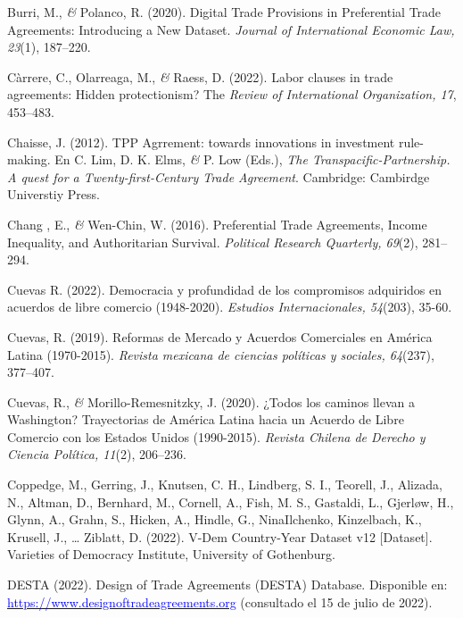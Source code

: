 \documentclass[a4paper]{tufte-handout}
\begin{document}
\begin{list}{}
\item{\small Burri, M., {\itshape \&} Polanco, R. (2020). Digital Trade Provisions in Preferential Trade Agreements: Introducing a New Dataset. {\itshape Journal of International Economic Law, 23}(1), 187--220.}

\item{\small Càrrere, C., Olarreaga, M., {\itshape \&} Raess, D. (2022). Labor clauses in trade agreements: Hidden protectionism? The {\itshape Review of International Organization, 17}, 453--483.}

\item{\small Chaisse, J. (2012). TPP Agrrement: towards innovations in investment rule-making. En C. Lim, D. K. Elms, {\itshape \&} P. Low (Eds.), {\itshape The Transpacific-Partnership. A quest for a Twenty-first-Century Trade Agreement}. Cambridge: Cambirdge Universtiy Press.}

\item{\small Chang , E., {\itshape \&} Wen-Chin, W. (2016). Preferential Trade Agreements, Income Inequality, and Authoritarian Survival. {\itshape Political Research Quarterly, 69}(2), 281--294.}

\item{\small Cuevas R. (2022). Democracia y profundidad de los compromisos adquiridos en acuerdos de libre comercio (1948-2020). {\itshape Estudios Internacionales, 54}(203), 35-60.}

\item{\small Cuevas, R. (2019). Reformas de Mercado y Acuerdos Comerciales en América Latina (1970-2015). {\itshape Revista mexicana de ciencias políticas y sociales, 64}(237), 377--407.}

\item{\small Cuevas, R., {\itshape \&} Morillo-Remesnitzky, J. (2020). ¿Todos los caminos llevan a Washington? Trayectorias de América Latina hacia un Acuerdo de Libre Comercio con los Estados Unidos (1990-2015). {\itshape Revista Chilena de Derecho y Ciencia Política, 11}(2), 206--236.}

\item{\small Coppedge, M., Gerring, J., Knutsen, C. H., Lindberg, S. I., Teorell, J., Alizada, N., Altman, D., Bernhard, M., Cornell, A., Fish, M. S., Gastaldi, L., Gjerløw, H., Glynn, A., Grahn, S., Hicken, A., Hindle, G., NinaIlchenko, Kinzelbach, K., Krusell, J., … Ziblatt, D. (2022). V-Dem Country-Year Dataset v12 [Dataset]. Varieties of Democracy Institute, University of Gothenburg.}

\item{\small DESTA (2022). Design of Trade Agreements (DESTA) Database. Disponible en: \href{https://www.designoftradeagreements.org/downloads}{\textcolor{blue}{https://www.designoftradeagreements.org}} (consultado el 15 de julio de 2022).}


\end{list}
\end{document}
